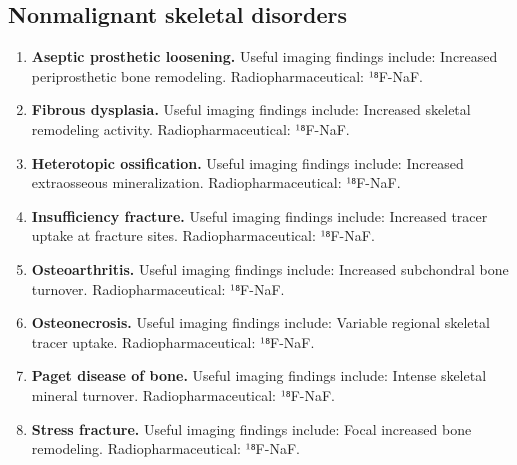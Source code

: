 \subsection{Nonmalignant skeletal disorders}
\begin{enumerate}[leftmargin=*,itemsep=0.45em,topsep=0.4em]
\item \textbf{Aseptic prosthetic loosening.} Useful imaging findings include: Increased periprosthetic bone remodeling. Radiopharmaceutical: ¹⁸F-NaF.
\item \textbf{Fibrous dysplasia.} Useful imaging findings include: Increased skeletal remodeling activity. Radiopharmaceutical: ¹⁸F-NaF.
\item \textbf{Heterotopic ossification.} Useful imaging findings include: Increased extraosseous mineralization. Radiopharmaceutical: ¹⁸F-NaF.
\item \textbf{Insufficiency fracture.} Useful imaging findings include: Increased tracer uptake at fracture sites. Radiopharmaceutical: ¹⁸F-NaF.
\item \textbf{Osteoarthritis.} Useful imaging findings include: Increased subchondral bone turnover. Radiopharmaceutical: ¹⁸F-NaF.
\item \textbf{Osteonecrosis.} Useful imaging findings include: Variable regional skeletal tracer uptake. Radiopharmaceutical: ¹⁸F-NaF.
\item \textbf{Paget disease of bone.} Useful imaging findings include: Intense skeletal mineral turnover. Radiopharmaceutical: ¹⁸F-NaF.
\item \textbf{Stress fracture.} Useful imaging findings include: Focal increased bone remodeling. Radiopharmaceutical: ¹⁸F-NaF.
\end{enumerate}

